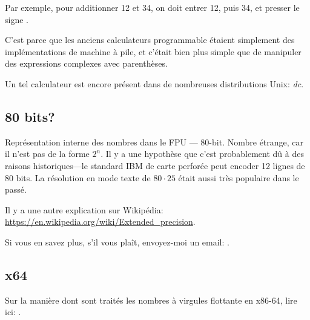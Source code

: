 Par exemple, pour additionner 12 et 34, on doit entrer 12, puis 34, et presser le
signe .

C'est parce que les anciens calculateurs programmable étaient simplement des implémentations
de machine à pile, et c'était bien plus simple que de manipuler des expressions
complexes avec parenthèses.

Un tel calculateur est encore présent dans de nombreuses distributions Unix: \emph{dc}.

\subsection{80 bits?}


Représentation interne des nombres dans le FPU --- 80-bit.
Nombre étrange, car il n'est pas de la forme $2^n$.
Il y a une hypothèse que c'est probablement dû à des raisons historiques---le standard
IBM de carte perforée peut encoder 12 lignes de 80 bits.
La résolution en mode texte de $80\cdot 25$ était aussi très populaire dans le passé.

Il y a une autre explication sur Wikipédia: \url{https://en.wikipedia.org/wiki/Extended_precision}.

Si vous en savez plus, s'il vous plaît, envoyez-moi un email: \EMAIL{}.

\subsection{x64}

Sur la manière dont sont traités les nombres à virgules flottante en x86-64, lire
ici: .



